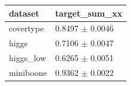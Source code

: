 \begin{tabular}{ll}
\toprule
dataset & target\_sum\_xx \\
\midrule
covertype & 0.8497 $\pm$ 0.0046 \\
higgs & 0.7106 $\pm$ 0.0047 \\
higgs\_low & 0.6265 $\pm$ 0.0051 \\
miniboone & 0.9362 $\pm$ 0.0022 \\
\bottomrule
\end{tabular}
